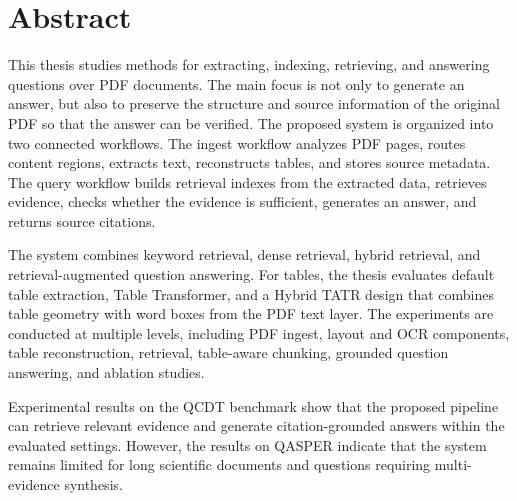 \documentclass[../DoAn.tex]{subfiles}
\begin{document}
\section*{Abstract}

This thesis studies methods for extracting, indexing, retrieving, and answering
questions over PDF documents. The main focus is not only to generate an answer,
but also to preserve the structure and source information of the original PDF so
that the answer can be verified. The proposed system is organized into two
connected workflows. The ingest workflow analyzes PDF pages, routes content
regions, extracts text, reconstructs tables, and stores source metadata. The query
workflow builds retrieval indexes from the extracted data, retrieves evidence,
checks whether the evidence is sufficient, generates an answer, and returns source
citations.

The system combines keyword retrieval, dense retrieval, hybrid retrieval, and
retrieval-augmented question answering. For tables, the thesis evaluates default
table extraction, Table Transformer, and a Hybrid TATR design that combines
table geometry with word boxes from the PDF text layer. The experiments are
conducted at multiple levels, including PDF ingest, layout and OCR components,
table reconstruction, retrieval, table-aware chunking, grounded question answering,
and ablation studies.

Experimental results on the QCDT benchmark show that the proposed pipeline can
retrieve relevant evidence and generate citation-grounded answers within the
evaluated settings. However, the results on QASPER indicate that the system
remains limited for long scientific documents and questions requiring
multi-evidence synthesis.
\end{document}
